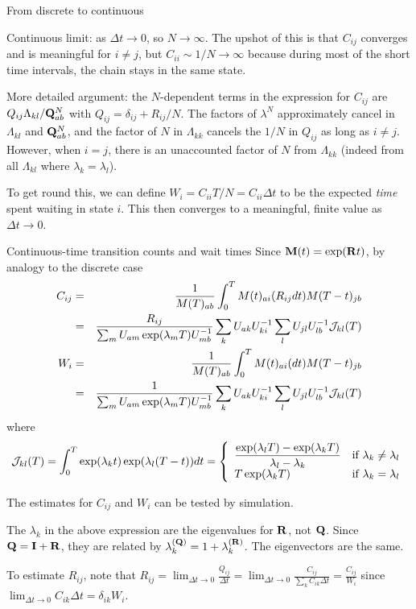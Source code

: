 \documentclass{beamer}
\begin{document}
\begin{frame}{From discrete to continuous}
 \itemb
\item Continuous limit: as $\Delta t \to 0$, so $N \to \infty$.
The upshot of this is that $C_{ij}$ converges and is meaningful for $i \neq j$, but $C_{ii} \sim 1/N \to \infty$
because during most of the short time intervals, the chain stays in the same state.
 \itemb
 \item More detailed argument: the $N$-dependent terms in the expression for $C_{ij}$
are $Q_{ij} \Lambda_{kl} / {\bf Q}^N_{ab}$
with $Q_{ij} = \delta_{ij} + R_{ij}/N$.
The factors of $\lambda^N$ approximately cancel in $\Lambda_{kl}$ and ${\bf Q}^N_{ab}$,
and the factor of $N$ in $\Lambda_{kk}$ cancels the $1/N$ in $Q_{ij}$ as long as $i \neq j$.
However, when $i=j$, there is an unaccounted factor of $N$ from $\Lambda_{kk}$
(indeed from all $\Lambda_{kl}$ where $\lambda_k = \lambda_l$).
 \item To get round this, we can define $W_i = C_{ii} T/N = C_{ii} \Delta t$ to be the expected {\em time} spent waiting in state $i$.
This then converges to a meaningful, finite value as $\Delta t \to 0$.
\iteme
\iteme
\end{frame}

\begin{frame}{Continuous-time transition counts and wait times}
\tiny
Since ${\bf M}(t) = \exp({\bf R}t)$, by analogy to the discrete case
\begin{eqnarray*}
C_{ij} & = & \frac{1}{M(T)_{ab}} \int_0^T M(t)_{ai} (R_{ij} dt) M(T-t)_{jb} \\
& = & \frac{R_{ij}}{\sum_m U_{am} \exp(\lambda_m T) U^{-1}_{mb}}
\sum_k U_{ak} U^{-1}_{ki} \sum_l U_{jl} U^{-1}_{lb} {\cal J}_{kl}(T) \\
W_i & = & \frac{1}{M(T)_{ab}} \int_0^T M(t)_{ai} (dt) M(T-t)_{jb} \\
& = & \frac{1}{\sum_m U_{am} \exp(\lambda_m T) U^{-1}_{mb}} \sum_k U_{ak} U^{-1}_{ki} \sum_l U_{jl} U^{-1}_{lb} {\cal J}_{kl}(T)
\end{eqnarray*}
where
\[
{\cal J}_{kl}(T) = \int_0^T \exp(\lambda_k t) \exp (\lambda_l(T-t)) dt = \left\{ \begin{array}{ll}
\displaystyle
\frac{\exp(\lambda_l T) - \exp(\lambda_k T)}{\lambda_l - \lambda_k} & \mbox{if $\lambda_k \neq \lambda_l$} \\
T \exp(\lambda_k T) & \mbox{if $\lambda_k = \lambda_l$}
\end{array} \right.
\]
\itemb
 \item The estimates for $C_{ij}$ and $W_i$ can be tested by simulation.
 \item The $\lambda_k$ in the above expression are the eigenvalues for ${\bf R}$, not ${\bf Q}$.
Since ${\bf Q} = {\bf I} + {\bf R}$, they are related by $\lambda_k^{({\bf Q})} = 1 + \lambda_k^{({\bf R})}$. The eigenvectors are the same.
 \item To estimate $R_{ij}$, note that $R_{ij} = \lim_{\Delta t \to 0} \frac{Q_{ij}}{\Delta t} = \lim_{\Delta t \to 0} \frac{C_{ij}}{\sum_k C_{ik} \Delta t} = \frac{C_{ij}}{W_i}$
since $\lim_{\Delta t \to 0} C_{ik} \Delta t = \delta_{ik} W_i$.
\iteme
\end{frame}
\end{document}
